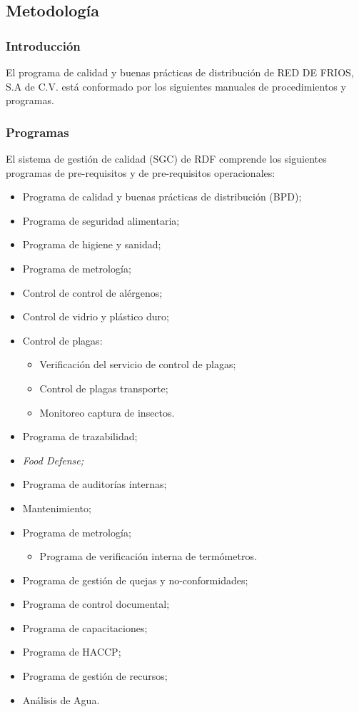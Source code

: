 \subsection{Metodología}

\subsubsection{Introducción}

El programa de calidad y buenas prácticas de distribución de RED DE FRIOS, S.A de C.V. está conformado por los siguientes manuales de procedimientos y programas.

\subsubsection{Programas}

El sistema de gestión de calidad (SGC) de RDF comprende los siguientes programas de pre-requisitos y de pre-requisitos operacionales:

\begin{itemize}
	\item Programa de calidad y buenas prácticas de distribución (BPD);
	\item Programa de seguridad alimentaria;
	\item Programa de higiene y sanidad;
	\item Programa de metrología;
	\item Control de control de alérgenos;
	\item Control de vidrio y plástico duro;
	\item Control de plagas:
	\begin{itemize}
		\item Verificación del servicio de control de plagas;
		\item Control de plagas transporte;
		\item Monitoreo captura de insectos.
	\end{itemize}
	\item Programa de trazabilidad;
	\item \emph{Food Defense;}
	\item Programa de auditorías internas;
	\item Mantenimiento;
	\item Programa de metrología;
	\begin{itemize}
		\item Programa de verificación interna de termómetros.
	\end{itemize}
	\item Programa de gestión de quejas y no-conformidades;
	\item Programa de control documental;
	\item Programa de capacitaciones;
	\item Programa de HACCP;
	\item Programa de gestión de recursos;
	\item Análisis de Agua.
\end{itemize}

